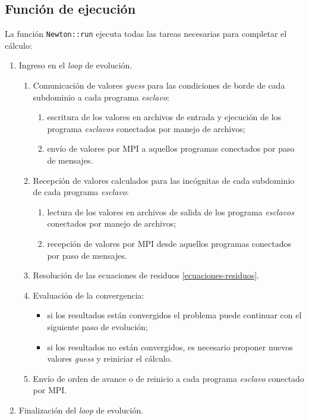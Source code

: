 \subsection*{Función de ejecución}
\label{ap2:newton-run}

La función \texttt{Newton::run} ejecuta todas las tareas necesarias para completar el cálculo:
\begin{enumerate}
\item Ingreso en el \textit{loop} de evolución.
  \begin{enumerate}
  \item Comunicación de valores \textit{guess} para las condiciones de borde de cada subdominio a cada programa \textit{esclavo}:
    \begin{enumerate}
    \item escritura de los valores en archivos de entrada y ejecución de los programa \textit{esclavos} conectados por manejo de archivos;
    \item envío de valores por MPI a aquellos programas conectados por paso de mensajes.
    \end{enumerate}
  \item Recepción de valores calculados para las incógnitas de cada subdominio de cada programa \textit{esclavo}:
    \begin{enumerate}
    \item lectura de los valores en archivos de salida de los programa \textit{esclavos} conectados por manejo de archivos;
    \item recepción de valores por MPI desde aquellos programas conectados por paso de mensajes.
    \end{enumerate}
  \item Resolución de las ecuaciones de residuos \ref{ecuaciones-residuos}.
  \item Evaluación de la convergencia:
  \begin{itemize}
  \item si los resultados están convergidos el problema puede continuar con el siguiente paso de evolución;
  \item si los resultados no están convergidos, es necesario proponer nuevos valores \textit{guess} y reiniciar el cálculo.
  \end{itemize}
  \item Envío de orden de avance o de reinicio a cada programa \textit{esclavo} conectado por MPI.
  \end{enumerate}
\item Finalización del \textit{loop} de evolución.
\end{enumerate}

